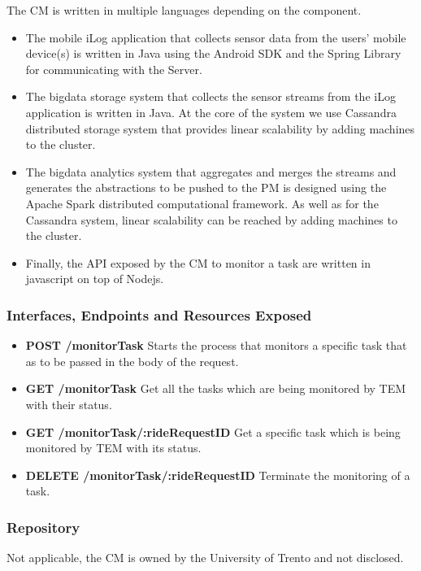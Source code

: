 The CM is written in multiple languages depending on the component. 
\begin{itemize}
\item{The mobile iLog application that collects sensor data from the users' mobile device(s) is written in Java using the Android SDK and the Spring Library for communicating with the Server.}
\item{The bigdata storage system that collects the sensor streams from the iLog application is written in Java. At the core of the system we use Cassandra distributed storage system that provides linear scalability by adding machines to the cluster.}
\item{The bigdata analytics system that aggregates and merges the streams and generates the abstractions to be pushed to the PM is designed using the Apache Spark distributed computational framework. As well as for the Cassandra system, linear scalability can be reached by adding machines to the cluster.}
\item{Finally, the API exposed by the CM to monitor a task are written in javascript on top of Nodejs.}
\end{itemize}

\subsubsection{Interfaces, Endpoints and Resources Exposed}

\begin{itemize}
\item {\bf POST /monitorTask} Starts the process that monitors a specific task that as to be passed in the body of the request.
\item {\bf GET /monitorTask} Get all the tasks which are being monitored by TEM with their status.
\item {\bf GET /monitorTask/:rideRequestID} Get a specific task which is being monitored by TEM with its status.
\item {\bf DELETE /monitorTask/:rideRequestID} Terminate the monitoring of a task.
\end{itemize}

\subsubsection{Repository}
Not applicable, the CM is owned by the University of Trento and not disclosed. 
